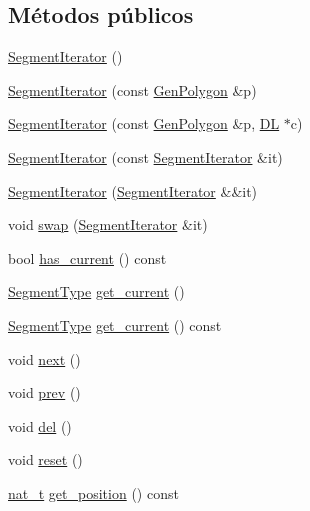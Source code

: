 \subsection*{Métodos públicos}
\begin{DoxyCompactItemize}
\item 
\hyperlink{class_designar_1_1_gen_polygon_1_1_segment_iterator_a80756e8c1b97f3f92ec2096de23ffbc8}{Segment\+Iterator} ()
\item 
\hyperlink{class_designar_1_1_gen_polygon_1_1_segment_iterator_a619943832325800e2962b92c9254c026}{Segment\+Iterator} (const \hyperlink{class_designar_1_1_gen_polygon}{Gen\+Polygon} \&p)
\item 
\hyperlink{class_designar_1_1_gen_polygon_1_1_segment_iterator_a47d2a28c926e54eda4afb078e00182a0}{Segment\+Iterator} (const \hyperlink{class_designar_1_1_gen_polygon}{Gen\+Polygon} \&p, \hyperlink{class_designar_1_1_d_l}{DL} $\ast$c)
\item 
\hyperlink{class_designar_1_1_gen_polygon_1_1_segment_iterator_a5b3e9dbdf9dfdc822c42ab87b15937f6}{Segment\+Iterator} (const \hyperlink{class_designar_1_1_gen_polygon_1_1_segment_iterator}{Segment\+Iterator} \&it)
\item 
\hyperlink{class_designar_1_1_gen_polygon_1_1_segment_iterator_aeb3c590a66d1f7073b98f6aa47453b02}{Segment\+Iterator} (\hyperlink{class_designar_1_1_gen_polygon_1_1_segment_iterator}{Segment\+Iterator} \&\&it)
\item 
void \hyperlink{class_designar_1_1_gen_polygon_1_1_segment_iterator_ac4645f540700248e954fefe6ec7b5d26}{swap} (\hyperlink{class_designar_1_1_gen_polygon_1_1_segment_iterator}{Segment\+Iterator} \&it)
\item 
bool \hyperlink{class_designar_1_1_gen_polygon_1_1_segment_iterator_a5a00faaa26edbf38c59d8d578e8e7d1b}{has\+\_\+current} () const
\item 
\hyperlink{class_designar_1_1_gen_polygon_a06fe54118b31269c3fc76cc9b5e55654}{Segment\+Type} \hyperlink{class_designar_1_1_gen_polygon_1_1_segment_iterator_ac70a85f86d2ff0b55b3bfe1a495afcc3}{get\+\_\+current} ()
\item 
\hyperlink{class_designar_1_1_gen_polygon_a06fe54118b31269c3fc76cc9b5e55654}{Segment\+Type} \hyperlink{class_designar_1_1_gen_polygon_1_1_segment_iterator_ad899db34f5eb391c6ad361e7eb7b889c}{get\+\_\+current} () const
\item 
void \hyperlink{class_designar_1_1_gen_polygon_1_1_segment_iterator_a29ad4efa177e5747bbd3fb181924f452}{next} ()
\item 
void \hyperlink{class_designar_1_1_gen_polygon_1_1_segment_iterator_ae9dd9bcb49dfb8be9b81403f730e9e89}{prev} ()
\item 
void \hyperlink{class_designar_1_1_gen_polygon_1_1_segment_iterator_a1eeabdc5b01ab8a6888b9cca583e6ccd}{del} ()
\item 
void \hyperlink{class_designar_1_1_gen_polygon_1_1_segment_iterator_a6d58451abb12f9d7f813f6368c8f2f68}{reset} ()
\item 
\hyperlink{namespace_designar_aa72662848b9f4815e7bf31a7cf3e33d1}{nat\+\_\+t} \hyperlink{class_designar_1_1_gen_polygon_1_1_segment_iterator_abb850f5034a93dd4da93de11c5619de5}{get\+\_\+position} () const
\end{DoxyCompactItemize}
